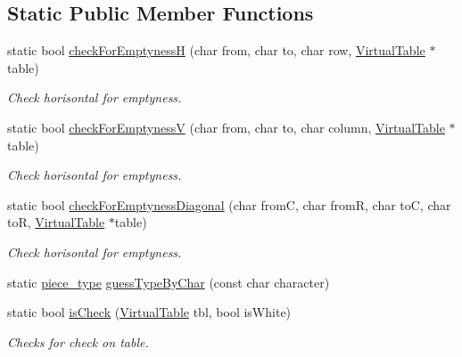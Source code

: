 \subsection*{Static Public Member Functions}
\begin{DoxyCompactItemize}
\item 
static bool \hyperlink{classChEngn_1_1Engine_aebba3d5fac90f1e829fc122b31f26064}{checkForEmptynessH} (char from, char to, char row, \hyperlink{classChEngn_1_1Table}{VirtualTable} $\ast$table)
\begin{DoxyCompactList}\small\item\em Check horisontal for emptyness. \item\end{DoxyCompactList}\item 
static bool \hyperlink{classChEngn_1_1Engine_ab812e459beb68c21e02370d0f7767299}{checkForEmptynessV} (char from, char to, char column, \hyperlink{classChEngn_1_1Table}{VirtualTable} $\ast$table)
\begin{DoxyCompactList}\small\item\em Check horisontal for emptyness. \item\end{DoxyCompactList}\item 
static bool \hyperlink{classChEngn_1_1Engine_afa008c74a0a46fc1dacd41ad2d8210e2}{checkForEmptynessDiagonal} (char fromC, char fromR, char toC, char toR, \hyperlink{classChEngn_1_1Table}{VirtualTable} $\ast$table)
\begin{DoxyCompactList}\small\item\em Check horisontal for emptyness. \item\end{DoxyCompactList}\item 
static \hyperlink{namespaceChEngn_a2a35c185f259757a78e937575b8ed483}{piece\_\-type} \hyperlink{classChEngn_1_1Engine_a57cb976b2427ba1da47365424de049e2}{guessTypeByChar} (const char character)
\item 
static bool \hyperlink{classChEngn_1_1Engine_adbbcab59c2baf952d0364a6c36a05a16}{isCheck} (\hyperlink{classChEngn_1_1Table}{VirtualTable} tbl, bool isWhite)
\begin{DoxyCompactList}\small\item\em Checks for check on table. \item\end{DoxyCompactList}\end{DoxyCompactItemize}
